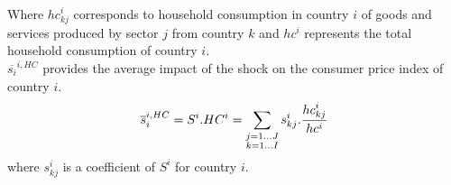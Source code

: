 \documentclass[11pt,a4paper]{article}
\begin{document}
Where ${hc}_{kj}^i$ corresponds to household consumption in country $i$ of goods and services produced by sector $j$ from country $k$ and $hc^i$ represents the total household consumption of country $i$. \\
$\overline{s_{i}}^{i,HC}$ provides the average impact of the shock on the consumer price index of country $i$. 
 \begin{eqnarray}
\overline{s}_{i}^{i,HC}=S^i.HC^i=\underset{\begin{subarray}{c}j=1\dots J \\ k=1 \dots I \end{subarray}}{\mathop \sum}\,{{s}_{kj}^i}.\frac{{hc}_{kj}^i}{hc^i}
\label{eq:eq6}
 \end{eqnarray} 
where ${s}_{kj}^i$ is a coefficient of $S^i$ for country $i$. 
\end{document}
